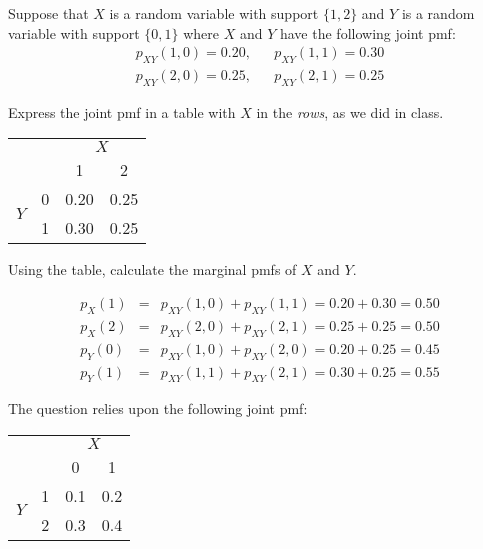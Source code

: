 \documentclass[addpoints,12pt]{exam}
\begin{document}
\begin{questions}
\question Suppose that $X$ is a random variable with support $\{1,2\}$ and $Y$ is a random variable with support $\{0,1\}$ where $X$ and $Y$ have the following joint pmf: 
			\begin{eqnarray*}
				p_{XY}(1,0) = 0.20, && p_{XY}(1,1) = 0.30 \\
				p_{XY}(2,0) = 0.25, && p_{XY}(2,1) = 0.25
			\end{eqnarray*}
	\begin{parts}
  \item Express the joint pmf in a table with $X$ in the \emph{rows}, as we did in class. 
			\begin{solution}
			\begin{center}
\begin{tabular}{|cc|cc|}
\hline
&&\multicolumn{2}{c|}{$X$}\\
&&1 & 2\\
\hline
\multirow{2}{*}{$Y$}
&0& \multicolumn{1}{|c}{0.20} & 0.25\\
&1& \multicolumn{1}{|c}{0.30} & 0.25\\
\hline
\end{tabular}
\end{center}
			\end{solution}
		\item Using the table, calculate the marginal pmfs of $X$ and $Y$.
			\begin{solution}
				\begin{eqnarray*}
					p_X(1) &=&p_{XY}(1,0) + p_{XY}(1,1)=0.20+0.30 = 0.50 \\
					p_X(2) &=&p_{XY}(2,0) + p_{XY}(2,1)=0.25 + 0.25 = 0.50 \\
					p_Y(0) &=&p_{XY}(1,0) + p_{XY}(2,0) = 0.20 + 0.25 = 0.45 \\
					p_Y(1) &=& p_{XY}(1,1) + p_{XY}(2,1) = 0.30 + 0.25 = 0.55
				\end{eqnarray*}
			\end{solution}
\end{parts}

\question The question relies upon the following joint pmf: 
			\begin{center}
\begin{tabular}{|cc|cc|}
\hline
&&\multicolumn{2}{c|}{$X$}\\
&&0 & 1\\
\hline
\multirow{2}{*}{$Y$}
&1& \multicolumn{1}{|c}{0.1} & 0.2\\
&2& \multicolumn{1}{|c}{0.3} & 0.4\\
\hline
\end{tabular}
\end{center}
\begin{parts}

\end{parts}
\end{questions}
\end{document}

